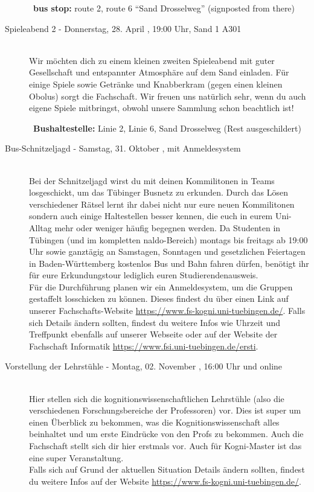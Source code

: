 \begin{description}
~\textbf{bus stop:} route 2, route 6 "`Sand Drosselweg"' (signposted from there)
\else
\item[Spieleabend 2 - Donnerstag, 28. April \YEAR, 19:00 Uhr, Sand 1 A301]\ \\
Wir möchten dich zu einem kleinen zweiten Spieleabend mit guter Gesellschaft
und entspannter Atmosphäre auf dem Sand einladen. Für einige Spiele sowie
Getränke und Knabberkram (gegen einen kleinen Obolus) sorgt die Fachschaft.
Wir freuen uns natürlich sehr, wenn du auch eigene Spiele mitbringst, obwohl unsere Sammlung schon beachtlich ist!

~\textbf{Bushaltestelle:} Linie 2, Linie 6, Sand Drosselweg (Rest ausgeschildert)
\fi



\ifkogwiss
\item[Bus-Schnitzeljagd - Samstag, 31. Oktober \YEAR, mit Anmeldesystem]\ \\
    Bei der Schnitzeljagd wirst du mit deinen Kommilitonen in Teams losgeschickt, um das Tübinger Busnetz zu erkunden. Durch das Lösen verschiedener Rätsel lernt ihr dabei nicht nur eure neuen Kommilitonen sondern auch einige Haltestellen besser kennen, die euch in eurem Uni-Alltag mehr oder weniger häufig begegnen werden. Da Studenten in Tübingen (und im kompletten naldo-Bereich) montags bis freitags ab 19:00 Uhr sowie ganztägig an Samstagen, Sonntagen und gesetzlichen Feiertagen in Baden-Württemberg kostenlos Bus und Bahn fahren dürfen, benötigt ihr für eure Erkundungstour lediglich euren Studierendenausweis.\\
    Für die Durchführung planen wir ein Anmeldesystem, um die Gruppen gestaffelt losschicken zu können. Dieses findest du über einen Link auf unserer Fachschafts-Website \url{https://www.fs-kogni.uni-tuebingen.de/}.
    Falls sich Details ändern sollten, findest du weitere Infos wie Uhrzeit und Treffpunkt ebenfalls auf unserer Webseite oder auf der Website der Fachschaft Informatik \url{https://www.fsi.uni-tuebingen.de/ersti}.\\
\fi

\ifkogwiss
\item[Vorstellung der Lehrstühle - Montag, 02. November \YEAR, 16:00 Uhr und online]\ \\
    Hier stellen sich die kognitionswissenschaftlichen Lehrstühle (also die verschiedenen Forschungsbereiche der Professoren) vor. Dies ist super um einen Überblick zu bekommen, was die Kognitionswissenschaft alles beinhaltet und um erste Eindrücke von den Profs zu bekommen. Auch die Fachschaft stellt sich dir hier erstmals vor. %
    Auch für Kogni-Master ist das eine super Veranstaltung. \\
    Falls sich auf Grund der aktuellen Situation Details ändern sollten, findest du weitere Infos auf der Website \url{https://www.fs-kogni.uni-tuebingen.de/}.
    

\end{description}
